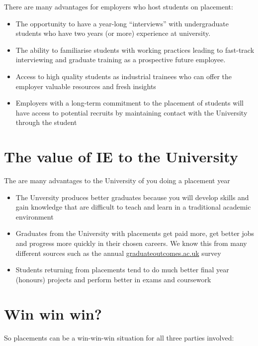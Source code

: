 \documentclass[
]{book}
\providecommand{\tightlist}{%
  \setlength{\itemsep}{0pt}\setlength{\parskip}{0pt}}
\begin{document}
There are many advantages for employers who host students on placement:

\begin{itemize}
\tightlist
\item
  The opportunity to have a year-long ``interviews'' with undergraduate students who have two years (or more) experience at university.
\item
  The ability to familiarise students with working practices leading to fast-track interviewing and graduate training as a prospective future employee.
\item
  Access to high quality students as industrial trainees who can offer the employer valuable resources and fresh insights
\item
  Employers with a long-term commitment to the placement of students will have access to potential recruits by maintaining contact with the University through the student
\end{itemize}

\section{The value of IE to the University}\label{uvalue}

The are many advantages to the University of you doing a placement year

\begin{itemize}
\tightlist
\item
  The Unversity produces better graduates because you will develop skills and gain knowledge that are difficult to teach and learn in a traditional academic environment
\item
  Graduates from the University with placements get paid more, get better jobs and progress more quickly in their chosen careers. We know this from many different sources such as the annual \href{https://www.graduateoutcomes.ac.uk/}{graduateoutcomes.ac.uk} survey
\item
  Students returning from placements tend to do much better final year (honours) projects and perform better in exams and coursework
\end{itemize}

\section{Win win win?}\label{win}

So placements can be a win-win-win situation for all three parties involved:
\end{document}
